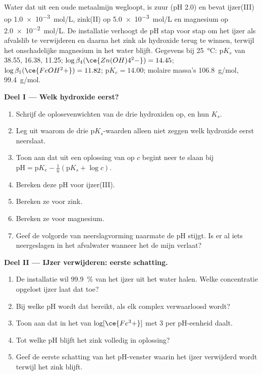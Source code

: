 \begin{problem}
\label{pb:b1:precipitation:1}
Water dat uit een oude metaalmijn wegloopt, is zuur (pH 2.0) en bevat
ijzer(III) op \qty{1.0e-3}{mol/L}, zink(II) op \qty{5.0e-3}{mol/L} en
magnesium op \qty{2.0e-2}{mol/L}. De installatie verhoogt de pH stap voor
stap om het ijzer als afvalslib te verwijderen en daarna het zink als
hydroxide terug te winnen, terwijl het onschadelijke magnesium in het
water blijft. Gegevens bij \qty{25}{\celsius}: $\mathrm{p}K_s$ van
 38.55, 
16.38,  11.25; $\log\beta_4(\ce{Zn(OH)4^2-}) = 14.45$;
$\log\beta_1(\ce{FeOH^2+}) = 11.82$; $\mathrm{p}K_e = 14.00$; molaire
massa's  \qty{106.8}{g/mol},  \qty{99.4}{g/mol}.

\medskip
\noindent\textbf{Deel I --- Welk hydroxide eerst?}
\begin{enumerate}
  \item Schrijf de oplosevenwichten van de drie hydroxiden op, en hun
        $K_s$.
  \item Leg uit waarom de drie $\mathrm{p}K_s$-waarden alleen niet zeggen
        welk hydroxide eerst neerslaat.
  \item Toon aan dat  uit een oplossing van  op $c$
        begint neer te slaan bij $\mathrm{pH} = \mathrm{p}K_e -
        \frac1n(\mathrm{p}K_s + \log c)$.
  \item Bereken deze pH voor ijzer(III).
  \item Bereken ze voor zink.
  \item Bereken ze voor magnesium.
  \item Geef de volgorde van neerslagvorming naarmate de pH stijgt. Is er
        al iets neergeslagen in het afvalwater wanneer het de mijn
        verlaat?
\end{enumerate}

\medskip
\noindent\textbf{Deel II --- IJzer verwijderen: eerste schatting.}
\begin{enumerate}[resume]
  \item De installatie wil \qty{99.9}{\percent} van het ijzer uit het water
        halen. Welke concentratie opgelost ijzer laat dat toe?
  \item Bij welke pH wordt dat bereikt, als elk complex verwaarloosd
        wordt?
  \item Toon aan dat in het  van 
        $\log[\ce{Fe^3+}]$ met 3 per pH-eenheid daalt.
  \item Tot welke pH blijft het zink volledig in oplossing?
  \item Geef de eerste schatting van het pH-venster waarin het ijzer
        verwijderd wordt terwijl het zink blijft.
\end{enumerate}


\end{problem}
